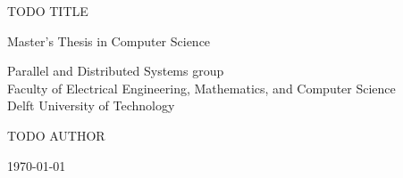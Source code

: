 \begin{titlepage}

  \begin{center}
  \null\vfill
    \begin{center}
    \LARGE{TODO TITLE}
    \end{center}

    \vspace{3cm}

    \begin{large}
    Master's Thesis in Computer Science
    \end{large}

    \vspace{1.5cm}

    \begin{normalsize}
    Parallel and Distributed Systems group\\
    Faculty of Electrical Engineering, Mathematics, and Computer Science\\
    Delft University of Technology
    \end{normalsize}

    \vspace{2.0cm}

    \begin{normalsize}
    TODO AUTHOR
    \end{normalsize}

    \vspace{1.0cm}

    \today            %

  \vfill
  \end{center}

\end{titlepage}

